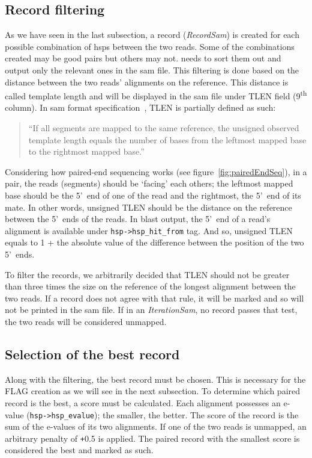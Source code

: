 \subsection{Record filtering}
\label{subsec:recFilter}
As we have seen in the last subsection, a record (\emph{RecordSam}) is created for each possible combination of \glspl{hsp} between the two reads.
Some of the combinations created may be good pairs but others may not.
\blastobam{} needs to sort them out and output only the relevant ones in the \gls{sam} file.
This filtering is done based on the distance between the two reads' alignments on the reference.
This distance is called template length and will be displayed in the \gls{sam} file under TLEN field (9\textsuperscript{th} column).
In \gls{sam} format specification~\cite{samspec}, TLEN is partially defined as such:
\begin{quote}
``If all segments are mapped to the same reference, the unsigned observed template length equals the number of bases from the leftmost mapped base to the rightmost mapped base.''
\end{quote}
Considering how paired-end sequencing works (see figure~\ref{fig:pairedEndSeq}), in a pair, the reads (segments) should be `facing' each others; the leftmost mapped base should be the 5'~end of one of the read and the rightmost, the 5'~end of its mate.
In other words, unsigned TLEN should be the distance on the reference between the 5'~ends of the reads.
In \gls{blast} output, the 5'~end of a read's alignment is available under \texttt{hsp->\allowbreak hsp\_hit\_from} tag.
And so, unsigned TLEN equals to 1 + the absolute value of the difference between the position of the two 5'~ends.

To filter the records, we arbitrarily decided that TLEN should not be greater than three times the size on the reference of the longest alignment between the two reads.
If a record does not agree with that rule, it will be marked and so will not be printed in the \gls{sam} file.
If in an \emph{IterationSam}, no record passes that test, the two reads will be considered unmapped.


\subsection{Selection of the best record}
\label{subsec:thereCanBeOnlyOne}
Along with the filtering, the best record must be chosen. This is necessary for the FLAG creation as we will see in the next subsection.
To determine which paired record is the best, a score must be calculated.
Each alignment possesses an e-value (\texttt{hsp->\allowbreak hsp\_evalue}); the smaller, the better.
The score of the record is the sum of the e-values of its two alignments.
If one of the two reads is unmapped, an arbitrary penalty of \texttt{+}0.5 is applied.
The paired record with the smallest score is considered the best and marked as such.


